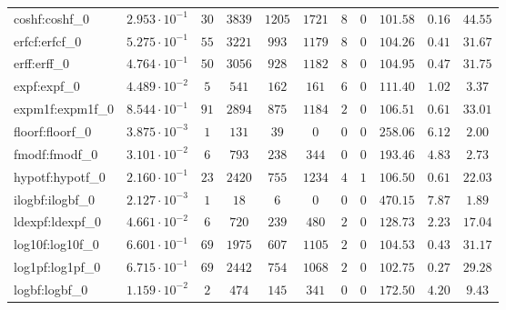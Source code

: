 \begin{tabular}{|l|c|c|c|c|c|c|c|c|c|c|}
coshf:coshf\_0               & $ 2.953 \cdot 10^{-1} $ & $ 30     $ & $ 3839  $ & $ 1205  $ & $ 1721  $ & $ 8   $ & $ 0 $ & $ 101.58      $ & $ 0.16    $ & $ 44.55   $ \\
erfcf:erfcf\_0               & $ 5.275 \cdot 10^{-1} $ & $ 55     $ & $ 3221  $ & $ 993   $ & $ 1179  $ & $ 8   $ & $ 0 $ & $ 104.26      $ & $ 0.41    $ & $ 31.67   $ \\
erff:erff\_0                 & $ 4.764 \cdot 10^{-1} $ & $ 50     $ & $ 3056  $ & $ 928   $ & $ 1182  $ & $ 8   $ & $ 0 $ & $ 104.95      $ & $ 0.47    $ & $ 31.75   $ \\
expf:expf\_0                 & $ 4.489 \cdot 10^{-2} $ & $ 5      $ & $ 541   $ & $ 162   $ & $ 161   $ & $ 6   $ & $ 0 $ & $ 111.40      $ & $ 1.02    $ & $ 3.37    $ \\
expm1f:expm1f\_0             & $ 8.544 \cdot 10^{-1} $ & $ 91     $ & $ 2894  $ & $ 875   $ & $ 1184  $ & $ 2   $ & $ 0 $ & $ 106.51      $ & $ 0.61    $ & $ 33.01   $ \\
floorf:floorf\_0             & $ 3.875 \cdot 10^{-3} $ & $ 1      $ & $ 131   $ & $ 39    $ & $ 0     $ & $ 0   $ & $ 0 $ & $ 258.06      $ & $ 6.12    $ & $ 2.00    $ \\
fmodf:fmodf\_0               & $ 3.101 \cdot 10^{-2} $ & $ 6      $ & $ 793   $ & $ 238   $ & $ 344   $ & $ 0   $ & $ 0 $ & $ 193.46      $ & $ 4.83    $ & $ 2.73    $ \\
hypotf:hypotf\_0             & $ 2.160 \cdot 10^{-1} $ & $ 23     $ & $ 2420  $ & $ 755   $ & $ 1234  $ & $ 4   $ & $ 1 $ & $ 106.50      $ & $ 0.61    $ & $ 22.03   $ \\
ilogbf:ilogbf\_0             & $ 2.127 \cdot 10^{-3} $ & $ 1      $ & $ 18    $ & $ 6     $ & $ 0     $ & $ 0   $ & $ 0 $ & $ 470.15      $ & $ 7.87    $ & $ 1.89    $ \\
ldexpf:ldexpf\_0             & $ 4.661 \cdot 10^{-2} $ & $ 6      $ & $ 720   $ & $ 239   $ & $ 480   $ & $ 2   $ & $ 0 $ & $ 128.73      $ & $ 2.23    $ & $ 17.04   $ \\
log10f:log10f\_0             & $ 6.601 \cdot 10^{-1} $ & $ 69     $ & $ 1975  $ & $ 607   $ & $ 1105  $ & $ 2   $ & $ 0 $ & $ 104.53      $ & $ 0.43    $ & $ 31.17   $ \\
log1pf:log1pf\_0             & $ 6.715 \cdot 10^{-1} $ & $ 69     $ & $ 2442  $ & $ 754   $ & $ 1068  $ & $ 2   $ & $ 0 $ & $ 102.75      $ & $ 0.27    $ & $ 29.28   $ \\
logbf:logbf\_0               & $ 1.159 \cdot 10^{-2} $ & $ 2      $ & $ 474   $ & $ 145   $ & $ 341   $ & $ 0   $ & $ 0 $ & $ 172.50      $ & $ 4.20    $ & $ 9.43    $ \\

\end{tabular}
